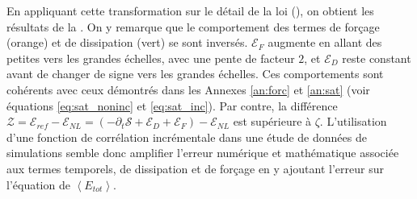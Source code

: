  
 En appliquant cette transformation sur le détail de la loi  (), on obtient les résultats de la  . On y remarque que le comportement des termes de forçage (orange) et de dissipation (vert) se sont inversés. $\mathcal{E}_{F}$ augmente en allant des petites vers les grandes échelles, avec une pente de facteur $2$, et $\mathcal{E}_{D} $ reste constant avant de changer de signe vers les grandes échelles. Ces comportements sont cohérents avec ceux démontrés dans les Annexes \ref{an:forc} et \ref{an:sat} (voir équations \eqref{eq:sat_noninc} et \eqref{eq:sat_inc}). Par contre, la différence $ \mathcal{Z} = \mathcal{E}_{ref} - \mathcal{E}_{NL} = (- \partial_t \mathcal{S} + \mathcal{E}_{D} + \mathcal{E}_{F}) - \mathcal{E}_{NL}$ est supérieure à $\zeta$. L'utilisation d'une fonction de corrélation incrémentale dans une étude de données de simulations semble donc amplifier l'erreur numérique et mathématique associée aux termes temporels, de dissipation et de forçage en y ajoutant l'erreur sur l'équation de $\left<E_{tot}\right>$. 
 
